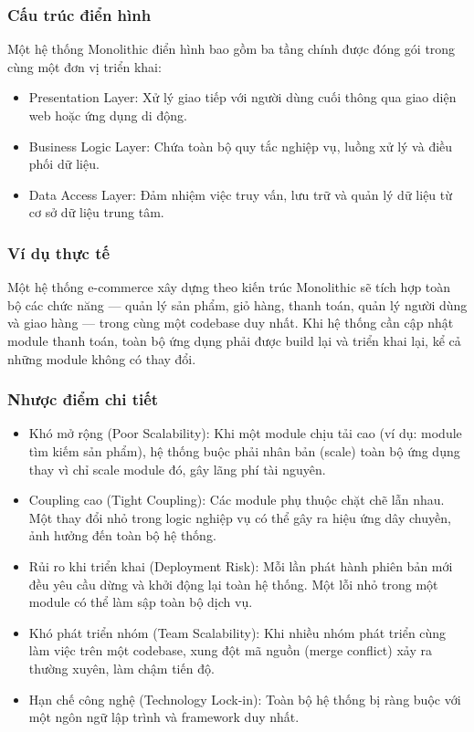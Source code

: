 \documentclass[12pt,a4paper]{article}
\begin{document}
\subsubsection{Cấu trúc điển hình}
Một hệ thống Monolithic điển hình bao gồm ba tầng chính được đóng gói trong cùng một đơn vị
triển khai:
\begin{itemize}
  \item Presentation Layer: Xử lý giao tiếp với người dùng cuối thông qua giao diện web hoặc ứng dụng di động.
  \item Business Logic Layer: Chứa toàn bộ quy tắc nghiệp vụ, luồng xử lý và điều phối dữ liệu.
  \item Data Access Layer: Đảm nhiệm việc truy vấn, lưu trữ và quản lý dữ liệu từ cơ sở dữ liệu trung tâm.
\end{itemize}

\subsubsection{Ví dụ thực tế}
Một hệ thống e-commerce xây dựng theo kiến trúc Monolithic sẽ tích hợp toàn bộ các chức năng
--- quản lý sản phẩm, giỏ hàng, thanh toán, quản lý người dùng và giao hàng --- trong cùng một
codebase duy nhất. Khi hệ thống cần cập nhật module thanh toán, toàn bộ ứng dụng phải được
build lại và triển khai lại, kể cả những module không có thay đổi.

\subsubsection{Nhược điểm chi tiết}
\begin{itemize}
  \item Khó mở rộng (Poor Scalability): Khi một module chịu tải cao (ví dụ: module tìm kiếm sản phẩm), hệ thống buộc phải nhân bản (scale) toàn bộ ứng dụng thay vì chỉ scale module đó, gây lãng phí tài nguyên.
  \item Coupling cao (Tight Coupling): Các module phụ thuộc chặt chẽ lẫn nhau. Một thay đổi nhỏ trong logic nghiệp vụ có thể gây ra hiệu ứng dây chuyền, ảnh hưởng đến toàn bộ hệ thống.
  \item Rủi ro khi triển khai (Deployment Risk): Mỗi lần phát hành phiên bản mới đều yêu cầu dừng và khởi động lại toàn hệ thống. Một lỗi nhỏ trong một module có thể làm sập toàn bộ dịch vụ.
  \item Khó phát triển nhóm (Team Scalability): Khi nhiều nhóm phát triển cùng làm việc trên một codebase, xung đột mã nguồn (merge conflict) xảy ra thường xuyên, làm chậm tiến độ.
  \item Hạn chế công nghệ (Technology Lock-in): Toàn bộ hệ thống bị ràng buộc với một ngôn ngữ lập trình và framework duy nhất.
\end{itemize}
\end{document}
